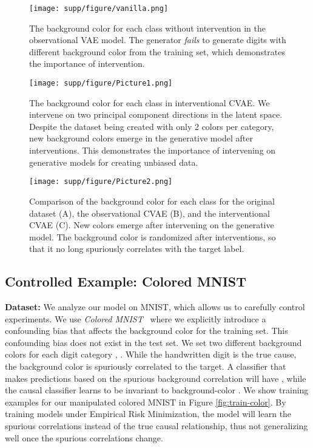 \documentclass[final]{cvpr}
\begin{document}
\begin{subappendices}
\begin{figure*}
  \centering
  \texttt{[image: supp/figure/vanilla.png]}
  \vspace{-5mm}
  \caption{The background color for each class without intervention in the observational VAE model. The generator \emph{fails} to generate digits with different background color from the training set, which demonstrates the importance of intervention.}
  \label{fig:vae-grid-ob}
\end{figure*}

\begin{figure*}
  \centering
  \texttt{[image: supp/figure/Picture1.png]}
  \vspace{-5mm}
  \caption{The background color for each class in interventional CVAE. We intervene on two principal component directions in the latent space. Despite the dataset being created with only 2 colors per category, new background colors emerge in the generative model after interventions. This demonstrates the importance of intervening on generative models for creating unbiased data.}

  \label{fig:vae-grid}
  \vspace{-5mm}
\end{figure*}


\begin{figure}
  \centering
  \texttt{[image: supp/figure/Picture2.png]}
  \caption{Comparison of the background color for each class for the original dataset (A), the observational CVAE (B), and the interventional CVAE (C). New colors emerge after intervening on the generative model. The background color is randomized after interventions, so that it no long spuriously correlates with the target label.}
\label{fig:compare-mnist}
\end{figure}

\subsection{Controlled Example: Colored MNIST}

\textbf{Dataset:} We analyze our model on MNIST, which allows us to carefully control experiments. We use \emph{Colored MNIST}~\cite{arjovsky2019invariant} where we explicitly introduce a confounding bias  that affects the background color  for the training set. This confounding bias does not exist in the test set. We set two different background colors for each digit category , . While the handwritten digit is the true cause, the background color is spuriously correlated to the target. A classifier that makes predictions based on the spurious background correlation will have , while the causal classifier learns to be invariant to background-color . We show training examples for our manipulated colored MNIST in Figure \ref{fig:train-color}. By training models under Empirical Risk Minimization, the model will learn the spurious correlations instead of the true causal relationship, thus not generalizing well once the spurious correlations change.


\end{subappendices}
\end{document}
